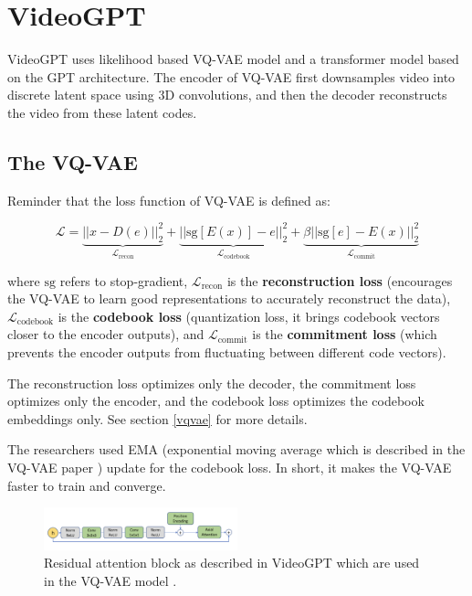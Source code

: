 \section{VideoGPT}
\label{sec:videogpt}

VideoGPT \cite{videogpt} uses likelihood based VQ-VAE model and a transformer model based on the GPT architecture. The encoder of VQ-VAE first downsamples video into discrete latent space using 3D convolutions, and then the decoder reconstructs the video from these latent codes.

\subsection*{The VQ-VAE}

Reminder that the loss function of VQ-VAE is defined as:

\begin{equation*}
    \mathcal{L} = \underbrace{\left| \left| x - D(e) \right| \right|^2_2}_{\mathcal{L}_\text{recon}} + \underbrace{\left| \left| \text{sg}\left[ E(x) \right] - e \right| \right|^2_2}_{\mathcal{L}_\text{codebook}} + \underbrace{\beta \left| \left| \text{sg}[e] - E(x) \right| \right|^2_2}_{\mathcal{L}_\text{commit}}
\end{equation*}

where $\text{sg}$ refers to stop-gradient, $\mathcal{L}_\text{recon}$ is the \textbf{reconstruction loss} (encourages the VQ-VAE to learn good representations to accurately reconstruct the data), $\mathcal{L}_\text{codebook}$ is the \textbf{codebook loss} (quantization loss, it brings codebook vectors closer to the encoder outputs), and $\mathcal{L}_\text{commit}$ is the \textbf{commitment loss} (which prevents the encoder outputs from fluctuating between different code vectors). 

The reconstruction loss optimizes only the decoder, the commitment loss optimizes only the encoder, and the codebook loss optimizes the codebook embeddings only. See section \ref{vqvae} for more details.

The researchers used EMA (exponential moving average which is described in the VQ-VAE paper \cite{vqvae}) update for the codebook loss. In short, it makes the VQ-VAE faster to train and converge.

\begin{figure}
    \centering
    \includegraphics[width=0.5\textwidth]{images/video_gpt/res_atten_block.png}
    \caption{Residual attention block as described in VideoGPT \cite{videogpt} which are used in the VQ-VAE model \cite{videogpt}.}
    \label{fig:videogpt_res_atten_block}
\end{figure}


